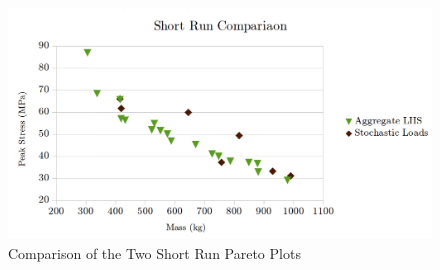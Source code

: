 \begin{figure}[!htbp]
\includegraphics[width=\textwidth]{img/pf_comp_short.png}
\caption{Comparison of the Two Short Run Pareto Plots}
\label{fig:pfront_comp_short}
\end{figure}

